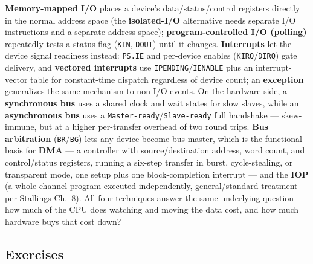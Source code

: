 \documentclass[11pt]{article}
\begin{document}
\textbf{Memory-mapped I/O} places a device's data/status/control registers directly in the normal address space (the \textbf{isolated-I/O} alternative needs separate I/O instructions and a separate address space); \textbf{program-controlled I/O (polling)} repeatedly tests a status flag (\texttt{KIN}, \texttt{DOUT}) until it changes. \textbf{Interrupts} let the device signal readiness instead: \texttt{PS.IE} and per-device enables (\texttt{KIRQ}/\texttt{DIRQ}) gate delivery, and \textbf{vectored interrupts} use \texttt{IPENDING}/\texttt{IENABLE} plus an interrupt-vector table for constant-time dispatch regardless of device count; an \textbf{exception} generalizes the same mechanism to non-I/O events. On the hardware side, a \textbf{synchronous bus} uses a shared clock and wait states for slow slaves, while an \textbf{asynchronous bus} uses a \texttt{Master-ready}/\texttt{Slave-ready} full handshake --- skew-immune, but at a higher per-transfer overhead of two round trips. \textbf{Bus arbitration} (\texttt{BR}/\texttt{BG}) lets any device become bus master, which is the functional basis for \textbf{DMA} --- a controller with source/destination address, word count, and control/status registers, running a six-step transfer in burst, cycle-stealing, or transparent mode, one setup plus one block-completion interrupt --- and the \textbf{IOP} (a whole channel program executed independently, general/standard treatment per Stallings Ch.~8). All four techniques answer the same underlying question --- how much of the CPU does watching and moving the data cost, and how much hardware buys that cost down?

\subsection*{Exercises}
\end{document}
